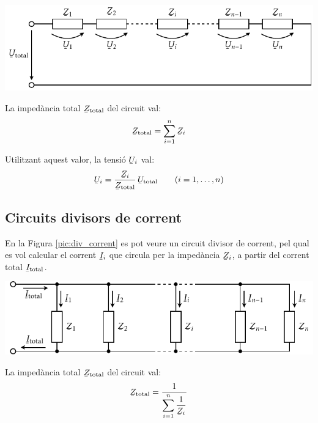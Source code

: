 \begin{center}
\centering
    \includegraphics{Imatges/Cap-Fonaments-Divisor-Tensio.pdf}
    \label{pic:div_tensio}
\end{center}

La imped\`{a}ncia total $\cmplx{Z}\ped{total}$ del circuit val:
\begin{equation}
    \cmplx{Z}\ped{total} = \sum_{i=1}^n \cmplx{Z}_i
\end{equation}

Utilitzant aquest valor, la tensi\'{o} $\cmplx{U}_i$ val:
\begin{equation}
    \cmplx{U}_i = \frac{\cmplx{Z}_i}{\cmplx{Z}\ped{total}}\,\cmplx{U}\ped{total}\qquad (i=1,\dots,n)\label{eq:div_tensio}
\end{equation}

\subsection{Circuits divisors de corrent}

En la Figura \vref{pic:div_corrent} es pot veure un circuit divisor
de corrent, pel qual es vol calcular el corrent $\cmplx{I}_i$ que
circula per la imped\`{a}ncia $\cmplx{Z}_i$, a partir del corrent total
$\cmplx{I}\ped{total}$.
\begin{center}
\centering
    \includegraphics{Imatges/Cap-Fonaments-Divisor-Corrent.pdf}
    \label{pic:div_corrent}
\end{center}

La imped\`{a}ncia total $\cmplx{Z}\ped{total}$ del circuit val:
\begin{equation}
    \cmplx{Z}\ped{total} = \frac{1}{\displaystyle\sum_{i=1}^n \frac{1}{\cmplx{Z}_i}}
\end{equation}

